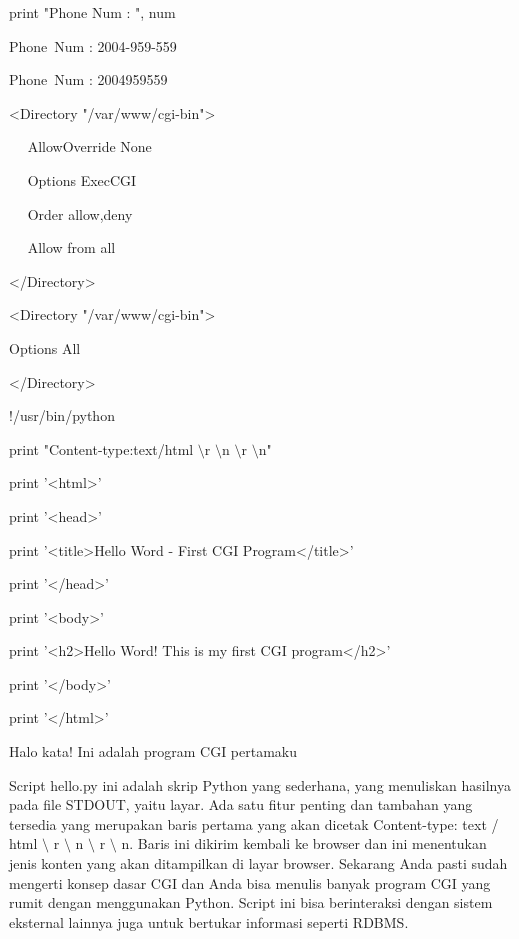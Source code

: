 \begin {enumerate}
\begin {enumerate}
\noindent
print "Phone Num : ", num \par
\vspace{12pt}
\noindent
Phone~Num :  2004-959-559 \par
\noindent
Phone~Num :  2004959559 \par
\vspace{12pt}
\noindent
<Directory "/var/www/cgi-bin"> \par
\noindent
~~ AllowOverride None \par
\noindent
~~ Options ExecCGI \par
\noindent
~~ Order allow,deny \par
\noindent
~~ Allow from all \par
\noindent
</Directory> \par
\vspace{12pt}
\noindent
<Directory "/var/www/cgi-bin"> \par
\noindent
Options All \par
\noindent
</Directory> \par
\vspace{12pt}
\noindent
!/usr/bin/python \par
\vspace{12pt}
\noindent
print "Content-type:text/html $  \setminus  $r $  \setminus  $n $  \setminus  $r $  \setminus  $n" \par
\noindent
print '<html>' \par
\noindent
print '<head>' \par
\noindent
print '<title>Hello Word - First CGI Program</title>' \par
\noindent
print '</head>' \par
\noindent
print '<body>' \par
\noindent
print '<h2>Hello Word! This is my first CGI program</h2>' \par
\noindent
print '</body>' \par
\noindent
print '</html>' \par
\vspace{12pt}
\vspace{12pt}
\noindent
Halo kata! Ini adalah program CGI pertamaku \par
\vspace{12pt}
Script hello.py ini adalah skrip Python yang sederhana, yang menuliskan hasilnya pada file STDOUT, yaitu layar. Ada satu fitur penting dan tambahan yang tersedia yang merupakan baris pertama yang akan dicetak Content-type: text / html  $  \setminus  $ r  $  \setminus  $ n  $  \setminus  $ r  $  \setminus  $ n. Baris ini dikirim kembali ke browser dan ini menentukan jenis konten yang akan ditampilkan di layar browser. Sekarang Anda pasti sudah mengerti konsep dasar CGI dan Anda bisa menulis banyak program CGI yang rumit dengan menggunakan Python. Script ini bisa berinteraksi dengan sistem eksternal lainnya juga untuk bertukar informasi seperti RDBMS. \par

\end{enumerate}
\end{enumerate}
